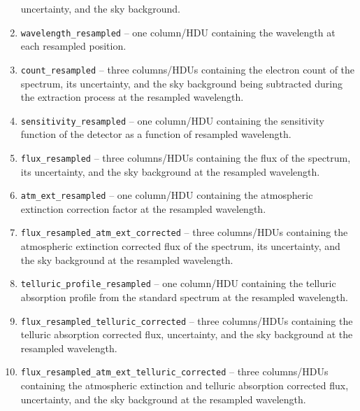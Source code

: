 \documentclass[linenumbers, twocolumn]{aastex631}
\begin{document}
\begin{enumerate}
    uncertainty, and the sky background.
    \item \texttt{wavelength\_resampled} -- one column/HDU containing the
    wavelength at each resampled position.
    \item \texttt{count\_resampled} -- three columns/HDUs containing the
    electron count of the spectrum, its uncertainty, and the sky background
    being subtracted during the extraction process at the resampled wavelength.
    \item \texttt{sensitivity\_resampled} -- one column/HDU containing the
    sensitivity function of the detector as a function of resampled wavelength.
    \item \texttt{flux\_resampled} -- three columns/HDUs containing the
    flux of the spectrum, its uncertainty, and the sky background at the
    resampled wavelength.
    \item \texttt{atm\_ext\_resampled} -- one column/HDU containing the
    atmospheric extinction correction factor at the resampled wavelength.
    \item \texttt{flux\_resampled\_atm\_ext\_corrected} -- three columns/HDUs
    containing the atmospheric extinction corrected flux of the spectrum, its
    uncertainty, and the sky background at the resampled wavelength.
    \item \texttt{telluric\_profile\_resampled} -- one column/HDU containing
    the telluric absorption profile from the standard spectrum at the resampled
    wavelength.
    \item \texttt{flux\_resampled\_telluric\_corrected} -- three columns/HDUs
    containing the telluric absorption corrected flux, uncertainty, and the sky
    background at the resampled wavelength.
    \item \texttt{flux\_resampled\_atm\_ext\_telluric\_corrected} -- three
    columns/HDUs containing the atmospheric extinction and telluric absorption
    corrected flux, uncertainty, and the sky background at the resampled
    wavelength.
\end{enumerate}


\end{document}
